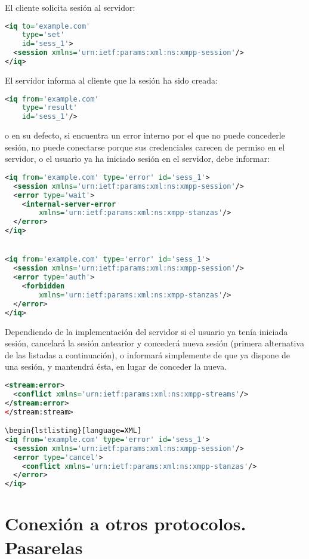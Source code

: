 \documentclass[a4paper, 11pt]{article} %
\begin{document}
    El cliente solicita sesión al servidor:
\begin{lstlisting}[language=XML]
<iq to='example.com'
    type='set'
    id='sess_1'>
  <session xmlns='urn:ietf:params:xml:ns:xmpp-session'/>
</iq>
\end{lstlisting}

    El servidor informa al cliente que la sesión ha sido creada:
\begin{lstlisting}[language=XML]   
<iq from='example.com'
    type='result'
    id='sess_1'/>
\end{lstlisting}

    o en su defecto, si encuentra un error interno por el que no puede concederle sesión, no puede conectarse porque
    sus credenciales carecen de permiso en el servidor, o el usuario ya ha iniciado sesión en el servidor, debe informar:
\begin{lstlisting}[language=XML]
<iq from='example.com' type='error' id='sess_1'>
  <session xmlns='urn:ietf:params:xml:ns:xmpp-session'/>
  <error type='wait'>
    <internal-server-error
        xmlns='urn:ietf:params:xml:ns:xmpp-stanzas'/>
  </error>
</iq>


<iq from='example.com' type='error' id='sess_1'>
  <session xmlns='urn:ietf:params:xml:ns:xmpp-session'/>
  <error type='auth'>
    <forbidden
        xmlns='urn:ietf:params:xml:ns:xmpp-stanzas'/>
  </error>
</iq>
\end{lstlisting}

    Dependiendo de la implementación del servidor si el usuario ya tenía iniciada sesión, cancelará la sesión antearior
    y concederá nueva sesión (primera alternativa de las listadas a continuación), o informará simplemente de que ya
    dispone de una sesión, y mantendrá ésta, en lugar de conceder la nueva.
\begin{lstlisting}[language=XML]
<stream:error>
  <conflict xmlns='urn:ietf:params:xml:ns:xmpp-streams'/>
</stream:error>
</stream:stream>

\begin{lstlisting}[language=XML]
<iq from='example.com' type='error' id='sess_1'>
  <session xmlns='urn:ietf:params:xml:ns:xmpp-session'/>
  <error type='cancel'>
    <conflict xmlns='urn:ietf:params:xml:ns:xmpp-stanzas'/>
  </error>
</iq>
\end{lstlisting}
    
\section{Conexión a otros protocolos. Pasarelas}
\end{document}
